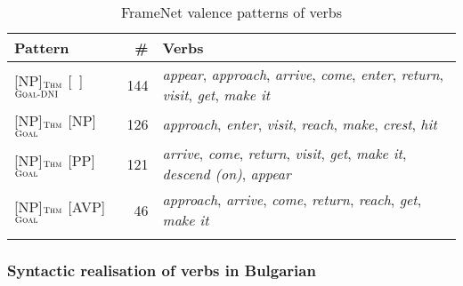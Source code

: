 \documentclass[output=paper,colorlinks,citecolor=brown]{langscibook}
\begin{document}
\begin{table}
    \begin{tabularx}{\textwidth}{lrQ}
    \lsptoprule
     Pattern & \# & Verbs \\ 
     \midrule
{}[NP]$_{\text{\textsc{Thm}}}$ [\ ]$_{\text{\textsc{Goal-DNI}}}$&  144& \textit{appear}, \textit{approach}, \textit{arrive}, \textit{come}, \textit{enter}, \textit{return}, \textit{visit}, \textit{get}, \textit{make it} \\
{}[NP]$_{\text{\textsc{Thm}}}$ [NP]$_{\text{\textsc{Goal}}}$ &  126&  \textit{approach}, \textit{enter}, \textit{visit}, \textit{reach}, \textit{make}, \textit{crest}, \textit{hit} \\ 
{}[NP]$_{\text{\textsc{Thm}}}$ [PP]$_{\text{\textsc{Goal}}}$& 121 & \textit{arrive}, \textit{come}, \textit{return}, \textit{visit}, \textit{get}, \textit{make it}, \textit{descend (on)}, \textit{appear} \\
{}[NP]$_{\text{\textsc{Thm}}}$ [AVP]$_{\text{\textsc{Goal}}}$ &  46&  \textit{approach}, \textit{arrive}, \textit{come}, \textit{return}, \textit{reach}, \textit{get}, \textit{make it}\\
\lspbottomrule
    \end{tabularx}
    \caption{FrameNet valence patterns of  verbs}
    \label{tab:4:arriving-valence-framenet}
\end{table} 


\subsubsection{Syntactic realisation of  verbs in Bulgarian}
\end{document}
